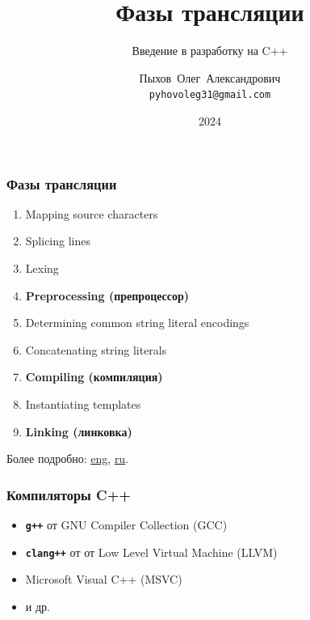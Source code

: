 \documentclass[compress]{beamer}
\title{Фазы трансляции}
\subtitle{Введение в разработку на C++}
\author{Пыхов~Олег~Александрович\inst{1} \\ \texttt{pyhovoleg31@gmail.com}}
\institute{
    \inst{1}%
    ООО~"Прософт-Системы"
}
\date{2024}
\begin{document}
\frame[plain]{\titlepage}

\begin{frame}

    \frametitle{Фазы трансляции}

    \begin{enumerate}

        \item Mapping source characters

        \item Splicing lines

        \item Lexing

        \item \textbf{Preprocessing (препроцессор)}

        \item Determining common string literal encodings

        \item Concatenating string literals

        \item \textbf{Compiling (компиляция)}

        \item Instantiating templates

        \item \textbf{Linking (линковка)}

    \end{enumerate}

    \vfill

    Более подробно:
    \href{https://en.cppreference.com/w/cpp/language/translation_phases}{eng},
    \href{https://ru.cppreference.com/w/cpp/language/translation_phases}{ru}.

\end{frame}

\begin{frame}

    \frametitle{Компиляторы C++}

    \begin{itemize}

        \item \texttt{\textbf{g++}} от GNU Compiler Collection (GCC)

        \item \texttt{\textbf{clang++}} от от Low Level Virtual Machine (LLVM)

        \item Microsoft Visual C++ (MSVC)

        \item и др.

    \end{itemize}

\end{frame}
\end{document}
